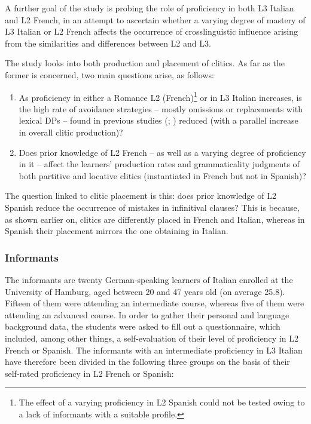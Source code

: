 \documentclass[output=paper,modfonts,nonflat,newtxmath]{langsci/langscibook}
\begin{document}
A further goal of the study is probing the role of proficiency in both L3 Italian and L2 French, in an attempt to ascertain whether a varying degree of mastery of L3 Italian or L2 French affects the occurrence of crosslinguistic influence arising from the similarities and differences between L2 and L3.

The study looks into both production and placement of clitics. As far as the former is concerned, two main questions arise, as follows:

\begin{enumerate}
\item
As proficiency in either a Romance L2 (French)\footnote{ \textrm{The effect of a varying proficiency in L2 Spanish could not be tested owing to a lack of informants with a suitable profile.}} or in L3 Italian increases, is the high rate of avoidance strategies – mostly omissions or replacements with lexical DPs – found in previous studies (\citealt[191]{ChiniEtAl2003}; \citealt{LeoniniBelletti2004, Leonini2006, Giannini2008, Maffei2009}) reduced (with a parallel increase in overall clitic production)?

\item
Does prior knowledge of L2 French – as well as a varying degree of proficiency in it – affect the learners’ production rates and grammaticality judgments of both partitive and locative clitics (instantiated in French but not in Spanish)?

\end{enumerate}

The question linked to clitic placement is this: does prior knowledge of L2 Spanish reduce the occurrence of mistakes in infinitival clauses? This is because, as shown earlier on, clitics are differently placed in French and Italian, whereas in Spanish their placement mirrors the one obtaining in Italian.

\subsubsection{Informants} %

The informants are twenty German-speaking learners of Italian enrolled at the University of Hamburg, aged between 20 and 47 years old (on average 25.8). Fifteen of them were attending an intermediate course, whereas five of them were attending an advanced course. In order to gather their personal and language background data, the students were asked to fill out a questionnaire, which included, among other things, a self-evaluation of their level of proficiency in L2 French or Spanish. The informants with an intermediate proficiency in L3 Italian have therefore been divided in the following three groups on the basis of their self-rated proficiency in L2 French or Spanish:
\end{document}
